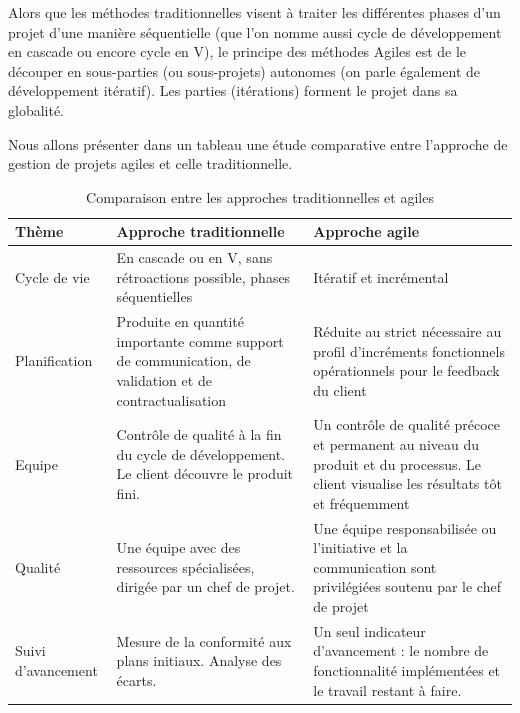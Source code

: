 Alors que les méthodes traditionnelles visent à traiter les différentes phases d’un projet d’une manière séquentielle (que l’on nomme aussi cycle de développement en cascade ou encore cycle
en V), le principe des méthodes Agiles est de le découper en sous-parties (ou sous-projets)
autonomes (on parle également de développement itératif). Les parties (itérations) forment le
projet dans sa globalité.

Nous allons présenter dans un tableau une étude comparative entre l’approche de gestion de projets agiles et celle traditionnelle.


\begin{table}[H]
	\centering
	\caption{Comparaison entre les approches traditionnelles et agiles}
	\label{tab:my-table}
	\begin{tabular}{|l|p{5cm}|p{6cm}|}
		\hline
		\textbf{Thème}      & \textbf{Approche traditionnelle}                                                                       & \textbf{Approche agile}                                                                                                                                              \\ \hline
		Cycle de vie        & En cascade ou en V, sans rétroactions possible, phases séquentielles                                   & Itératif et incrémental                                                                                                                                              \\ \hline
		Planification       & Produite en quantité importante comme support de communication, de validation et de contractualisation & Réduite au strict nécessaire au profil d’incréments fonctionnels opérationnels pour le feedback du client                                                            \\ \hline
		Equipe              & Contrôle de qualité à la fin du cycle de développement. Le client découvre le produit fini.            & Un contrôle de qualité précoce et permanent au niveau du produit et du processus. Le client visualise les résultats tôt et fréquemment                               \\ \hline
		Qualité             & Une équipe avec des ressources spécialisées, dirigée par un chef de projet.                            & Une équipe responsabilisée ou l’initiative et la communication sont privilégiées soutenu par le chef de projet                                                       \\ \hline
		Suivi d’avancement  & Mesure de la conformité aux plans initiaux. Analyse des écarts.                                        & Un seul indicateur d’avancement : le nombre de fonctionnalité implémentées et le travail restant à faire.                                                            \\ \hline

\end{tabular}
\end{table}
